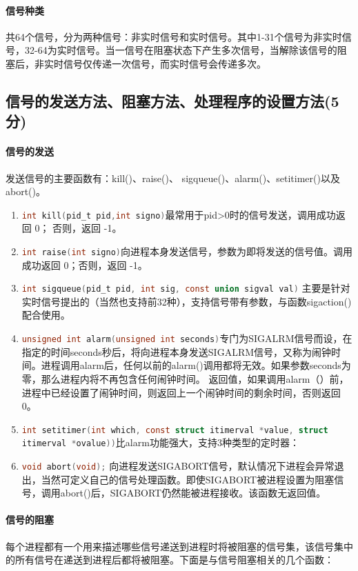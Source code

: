 \paragraph{信号种类}共64个信号，分为两种信号：非实时信号和实时信号。其中1-31个信号为非实时信号，32-64为实时信号。当一信号在阻塞状态下产生多次信号，当解除该信号的阻塞后，非实时信号仅传递一次信号，而实时信号会传递多次。

\subsection{信号的发送方法、阻塞方法、处理程序的设置方法(5分)}
\paragraph{信号的发送}发送信号的主要函数有：kill()、raise()、 sigqueue()、alarm()、setitimer()以及abort()。
\begin{enumerate}
    \item \lstinline[language=c]|int kill(pid_t pid,int signo)|最常用于pid>0时的信号发送，调用成功返回 0； 否则，返回 -1。
    \item \lstinline[language=c]|int raise(int signo)|向进程本身发送信号，参数为即将发送的信号值。调用成功返回 0；否则，返回 -1。
    \item \lstinline[language=c]|int sigqueue(pid_t pid, int sig, const union sigval val)| 主要是针对实时信号提出的（当然也支持前32种），支持信号带有参数，与函数sigaction()配合使用。
    \item \lstinline[language=c]|unsigned int alarm(unsigned int seconds)|专门为SIGALRM信号而设，在指定的时间seconds秒后，将向进程本身发送SIGALRM信号，又称为闹钟时间。进程调用alarm后，任何以前的alarm()调用都将无效。如果参数seconds为零，那么进程内将不再包含任何闹钟时间。 
    返回值，如果调用alarm（）前，进程中已经设置了闹钟时间，则返回上一个闹钟时间的剩余时间，否则返回0。
    \item \lstinline[language=c]|int setitimer(int which, const struct itimerval *value, struct itimerval *ovalue))|比alarm功能强大，支持3种类型的定时器：
    \item \lstinline[language=c]|void abort(void);| 向进程发送SIGABORT信号，默认情况下进程会异常退出，当然可定义自己的信号处理函数。即使SIGABORT被进程设置为阻塞信号，调用abort()后，SIGABORT仍然能被进程接收。该函数无返回值。
\end{enumerate}

\paragraph{信号的阻塞}每个进程都有一个用来描述哪些信号递送到进程时将被阻塞的信号集，该信号集中的所有信号在递送到进程后都将被阻塞。下面是与信号阻塞相关的几个函数：

